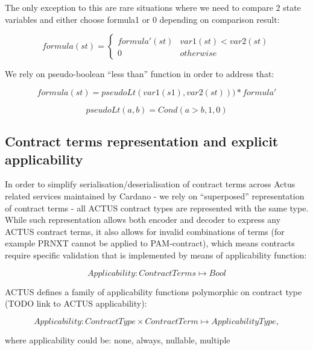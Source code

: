 \documentclass[runningheads]{llncs}
\begin{document}
The only exception to this are rare situations where we need to compare
2 state variables and either choose formula1 or 0 depending on comparison
result:

\begin{equation}
formula(st)=\begin{cases}
formula'(st) & var1(st)<var2(st)\\
0 & otherwise
\end{cases}
\end{equation}

We rely on pseudo-boolean ``less than'' function in order to address
that:

\noindent 
\begin{equation}
formula(st)=pseudoLt(var1(s1),var2(st)))*formula'
\end{equation}

\noindent 
\begin{equation}
pseudoLt(a,b)=Cond(a>b,1,0)
\end{equation}


\subsection{Contract terms representation and explicit applicability}

In order to simplify serialisation/deserialisation of contract terms
across Actus related services maintained by Cardano - we rely on ``superposed''
representation of contract terms - all ACTUS contract types are represented
with the same type. While such representation allows both encoder
and decoder to express any ACTUS contract terms, it also allows for
invalid combinations of terms (for example PRNXT cannot be applied
to PAM-contract), which means contracts require specific validation
that is implemented by means of applicability function:

\noindent 
\begin{equation}
Applicability:ContractTerms\mapsto Bool
\end{equation}

ACTUS defines a family of applicability functions polymorphic on contract
type (TODO link to ACTUS applicability):

\noindent 
\begin{equation}
Applicability:ContractType\times ContractTerm\mapsto ApplicabilityType,
\end{equation}

where applicability could be: none, always, nullable, multiple
\end{document}
